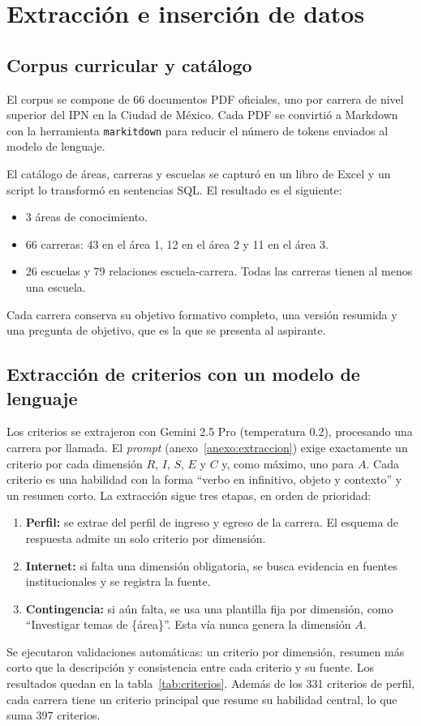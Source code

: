\section{Extracción e inserción de datos}

\subsection{Corpus curricular y catálogo}
El corpus se compone de 66 documentos PDF oficiales, uno por carrera de nivel superior del IPN en la Ciudad de México. Cada PDF se convirtió a Markdown con la herramienta \texttt{markitdown} para reducir el número de tokens enviados al modelo de lenguaje.

El catálogo de áreas, carreras y escuelas se capturó en un libro de Excel y un script lo transformó en sentencias SQL. El resultado es el siguiente:
\begin{itemize}
    \item 3 áreas de conocimiento.
    \item 66 carreras: 43 en el área 1, 12 en el área 2 y 11 en el área 3.
    \item 26 escuelas y 79 relaciones escuela-carrera. Todas las carreras tienen al menos una escuela.
\end{itemize}
Cada carrera conserva su objetivo formativo completo, una versión resumida y una pregunta de objetivo, que es la que se presenta al aspirante.

\subsection{Extracción de criterios con un modelo de lenguaje}
Los criterios se extrajeron con Gemini 2.5 Pro (temperatura 0.2), procesando una carrera por llamada. El \textit{prompt} (anexo~\ref{anexo:extraccion}) exige exactamente un criterio por cada dimensión $R$, $I$, $S$, $E$ y $C$ y, como máximo, uno para $A$. Cada criterio es una habilidad con la forma ``verbo en infinitivo, objeto y contexto'' y un resumen corto. La extracción sigue tres etapas, en orden de prioridad:
\begin{enumerate}
    \item \textbf{Perfil:} se extrae del perfil de ingreso y egreso de la carrera. El esquema de respuesta admite un solo criterio por dimensión.
    \item \textbf{Internet:} si falta una dimensión obligatoria, se busca evidencia en fuentes institucionales y se registra la fuente.
    \item \textbf{Contingencia:} si aún falta, se usa una plantilla fija por dimensión, como ``Investigar temas de \{área\}''. Esta vía nunca genera la dimensión $A$.
\end{enumerate}
Se ejecutaron validaciones automáticas: un criterio por dimensión, resumen más corto que la descripción y consistencia entre cada criterio y su fuente. Los resultados quedan en la tabla~\ref{tab:criterios}. Además de los 331 criterios de perfil, cada carrera tiene un criterio principal que resume su habilidad central, lo que suma 397 criterios.

